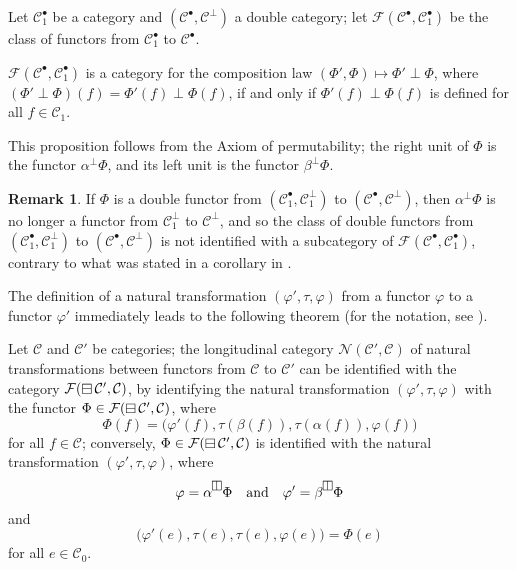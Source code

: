 \documentclass[a4paper,fleqn]{article}
\theoremstyle{plain}
\newenvironment{theorem}[1]
  {\renewcommand\theinnertheorem{#1}\innertheorem}
  {\endinnertheorem}
\newenvironment{proposition}[1]
  {\renewcommand\theinnerproposition{#1}\innerproposition}
  {\endinnerproposition}
\theoremstyle{definition}
\newtheorem*{remark}{Remark}
\newcommand{\oldpage}[1]{{\marginpar{\footnotesize$\bigg\vert$\,\,\,\,\textit{p.~#1}}}}
\newcommand{\textand}{\quad\text{and}\quad}
\newcommand{\CC}{\mathcal{C}}
\newcommand{\FF}{\mathcal{F}}
\newcommand{\NN}{\mathcal{N}}
\newcommand{\hsqbox}{{\boxminus}}
\newcommand{\vsqbox}{{\rotatebox{90}{$\boxminus$}}}
\DeclareMathOperator{\hsq}{\raisebox{-.05em}{$\hsqbox$}}
\begin{document}
Let $\CC_1^\bullet$ be a category and $(\CC^\bullet,\CC^\perp)$ a double category;
let $\FF(\CC^\bullet,\CC_1^\bullet)$ be the class of functors from $\CC_1^\bullet$ to $\CC^\bullet$.

\begin{proposition}{14}
\label{proposition:ii-14}
  $\FF(\CC^\bullet,\CC_1^\bullet)$ is a category for the composition law $(\Phi',\Phi)\mapsto\Phi'\perp\Phi$, where $(\Phi'\perp\Phi)(f)=\Phi'(f)\perp\Phi(f)$, if and only if $\Phi'(f)\perp\Phi(f)$ is defined for all $f\in\CC_1$.
\end{proposition}

This proposition follows from the Axiom of permutability;
the right unit of $\Phi$ is the functor $\alpha^\perp\Phi$, and its left unit is the functor $\beta^\perp\Phi$.

\begin{remark}
  If $\Phi$ is a double functor from $(\CC_1^\bullet,\CC_1^\perp)$ to $(\CC^\bullet,\CC^\perp)$, then $\alpha^\perp\Phi$ is no longer a functor from $\CC_1^\perp$ to $\CC^\perp$, and so the class of double functors from $(\CC_1^\bullet,\CC_1^\perp)$ to $(\CC^\bullet,\CC^\perp)$ is not identified with a subcategory of $\FF(\CC^\bullet,\CC_1^\bullet)$, contrary to what was stated in a corollary in \cite{3e}.
\end{remark}

The definition of a natural transformation $(\varphi',\tau,\varphi)$ from a functor $\varphi$ to a functor $\varphi'$ immediately leads to the following theorem (for the notation, see \cite{3d}).

\begin{theorem}{7}
\label{theorem:ii-7}
  Let $\CC$ and $\CC'$ be categories;
  the longitudinal category $\NN(\CC',\CC)$ of natural transformations between functors from $\CC$ to $\CC'$ can be identified with the category $\FF(\hsq\CC',\CC)$, by identifying the natural transformation $(\varphi',\tau,\varphi)$ with the functor $\Phi\in\FF(\hsq\CC',\CC)$, where
  \[
    \Phi(f)
    = \big(
      \varphi'(f), \tau(\beta(f)), \tau(\alpha(f)), \varphi(f)
    \big)
  \]
  for all $f\in\CC$;
  \oldpage{68}
  conversely, $\Phi\in\FF(\hsq\CC',\CC)$ is identified with the natural transformation $(\varphi',\tau,\varphi)$, where
  \[
    \varphi=\alpha^\vsqbox\Phi
    \textand
    \varphi'=\beta^\vsqbox\Phi
  \]
  and
  \[
    \big(
      \varphi'(e), \tau(e), \tau(e), \varphi(e)
    \big)
    = \Phi(e)
  \]
  for all $e\in\CC_0$.
\end{theorem}
\end{document}
